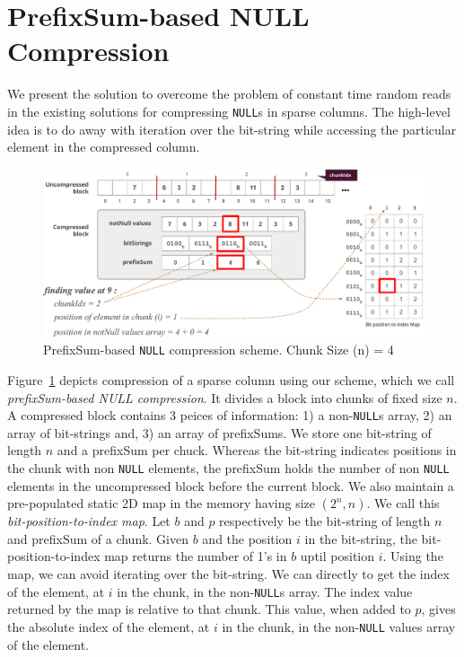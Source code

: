 \section{PrefixSum-based NULL Compression}
\label{sec:prefixbased}

We present the solution to overcome the problem of constant time random reads in the existing solutions for compressing \texttt{NULL}s in sparse columns. The high-level idea is to do away with iteration over the bit-string while accessing the particular element in the compressed column.

\begin{figure}
	\vspace{-20pt}
	\hfill\includegraphics[scale=0.70]{img/null2}\hspace*{\fill}
	\captionsetup{justification=centering}
	\caption{PrefixSum-based \texttt{NULL} compression scheme. Chunk Size (n) = 4}
	\label{fig:null2}
	\vspace{-2pt}
\end{figure}

Figure~\ref{fig:null2} depicts compression of a sparse column using our scheme, which we call \emph{prefixSum-based NULL compression}. It divides a block into chunks of fixed size $n$. A compressed block contains 3 peices of information: 1) a non-\texttt{NULL}s array, 2) an array of bit-strings and, 3) an array of prefixSums. We store one bit-string of length $n$ and a prefixSum per chuck. Whereas the bit-string indicates positions in the chunk with non \texttt{NULL} elements, the prefixSum holds the number of non \texttt{NULL} elements in the uncompressed block before the current block. We also maintain a pre-populated static 2D map in the memory having size $(2^n, n)$. We call this \emph{bit-position-to-index map}. Let $b$ and $p$ respectively be the bit-string of length $n$ and prefixSum of a chunk. Given $b$ and the position $i$ in the bit-string, the bit-position-to-index map returns the number of 1's in $b$ uptil position $i$. Using the map, we can avoid iterating over the bit-string. We can directly to get the index of the element, at $i$ in the chunk, in the non-\texttt{NULL}s array. The index value returned by the map is relative to that chunk. This value, when added to $p$, gives the absolute index of the element, at $i$ in the chunk, in the non-\texttt{NULL} values array of the element.

